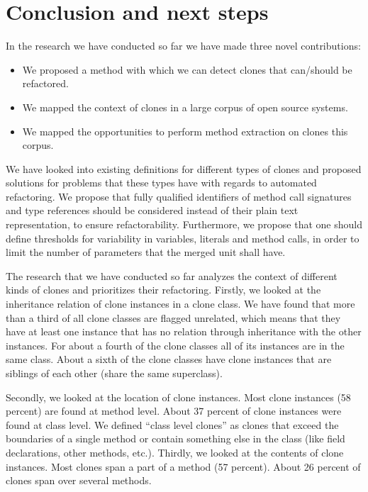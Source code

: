 \documentclass[a4paper]{article}
\begin{document}
\section{Conclusion and next steps}\label{chap:conclusion}
In the research we have conducted so far we have made three novel contributions:
\begin{itemize}
    \item We proposed a method with which we can detect clones that can/should be refactored.
    \item We mapped the context of clones in a large corpus of open source systems.
    \item We mapped the opportunities to perform method extraction on clones this corpus.
\end{itemize}

We have looked into existing definitions for different types of clones \cite{roy2007survey} and proposed solutions for problems that these types have with regards to automated refactoring. We propose that fully qualified identifiers of method call signatures and type references should be considered instead of their plain text representation, to ensure refactorability. Furthermore, we propose that one should define thresholds for variability in variables, literals and method calls, in order to limit the number of parameters that the merged unit shall have.

The research that we have conducted so far analyzes the context of different kinds of clones and prioritizes their refactoring. Firstly, we looked at the inheritance relation of clone instances in a clone class. We have found that more than a third of all clone classes are flagged unrelated, which means that they have at least one instance that has no relation through inheritance with the other instances. For about a fourth of the clone classes all of its instances are in the same class. About a sixth of the clone classes have clone instances that are siblings of each other (share the same superclass).

Secondly, we looked at the location of clone instances. Most clone instances (58 percent) are found at method level. About 37 percent of clone instances were found at class level. We defined ``class level clones'' as clones that exceed the boundaries of a single method or contain something else in the class (like field declarations, other methods, etc.). Thirdly, we looked at the contents of clone instances. Most clones span a part of a method (57 percent). About 26 percent of clones span over several methods.
\end{document}
